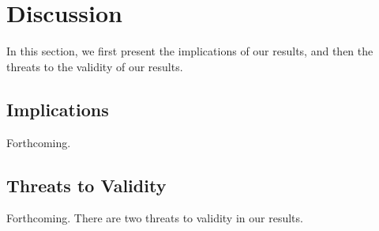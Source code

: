 \section{Discussion}
\label{sec:discussion}
In this section, we first present the implications of our results, and then the threats to the validity of our results.

\subsection{Implications}
\label{sec:implications}
Forthcoming.


\subsection{Threats to Validity}
\label{sec:validity}
Forthcoming.
There are two threats to validity in our results.